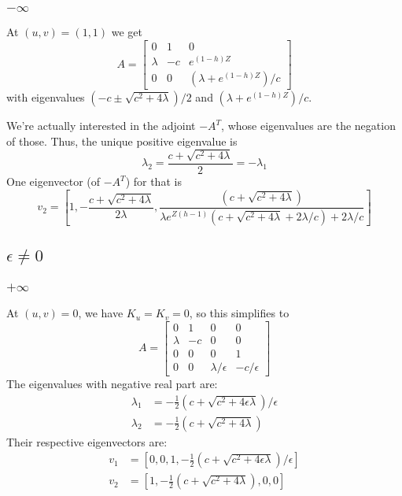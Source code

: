 \documentclass[10pt]{article}
\begin{document}
\subsubsection{$-\infty$}
At $(u,v) = (1,1)$ we get
\[
A = \begin{bmatrix}
0 & 1 & 0 \\
\lambda &  -c  &  e^{(1-h)Z} \\
0 &  0  &  (\lambda + e^{(1-h)Z})/c
\end{bmatrix}
\]
with eigenvalues $(-c \pm \sqrt{c^2 + 4 \lambda})/2$ and $(\lambda + e^{(1-h)Z})/c$.

We're actually interested in the adjoint $-A^T$, whose eigenvalues are the negation of those.
Thus, the unique positive eigenvalue is
\[\lambda_2 = \frac{c + \sqrt{c^2 + 4 \lambda}}{2} = -\lambda_1 \]
One eigenvector (of $-A^T$) for that is
\[
v_2 = \left[1, -\frac{c + \sqrt{c^2 + 4 \lambda}}{2\lambda}, \frac{(c + \sqrt{c^2+4\lambda})}{\lambda e^{Z(h-1)}(c + \sqrt{c^2+4\lambda} + 2 \lambda/c)+ 2 \lambda / c}\right]
\]

\subsection{$\epsilon \neq 0$}
\subsubsection{$+\infty$}
At $(u,v) = 0$, we have $K_u = K_v = 0$, so this simplifies to
\[
A = \begin{bmatrix}
0 & 1 & 0 & 0 \\
\lambda &  -c  &  0  & 0 \\
0 & 0 & 0 & 1 \\
0 &  0  &  \lambda /\epsilon  &  - c / \epsilon
\end{bmatrix}
\]
The eigenvalues with negative real part are:
\begin{align*}
    \lambda_1 &= -\frac{1}{2} (c + \sqrt{c^2 + 4 \epsilon \lambda})/\epsilon\\
    \lambda_2 &= -\frac{1}{2} (c + \sqrt{c^2 + 4 \lambda})
\end{align*}
Their respective eigenvectors are:
\begin{align*}
    v_1 &= [0,0,1,-\frac{1}{2} (c + \sqrt{c^2 + 4 \epsilon \lambda})/\epsilon] \\
    v_2 &= [1, -\frac{1}{2} (c + \sqrt{c^2 + 4 \lambda}), 0, 0]
\end{align*}
\end{document}

